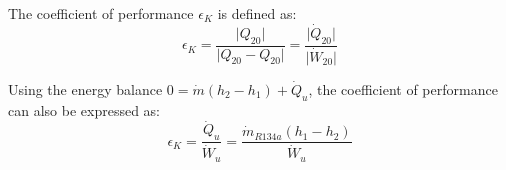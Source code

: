 The coefficient of performance \( \epsilon_K \) is defined as:  
\[
\epsilon_K = \frac{\lvert Q_{20} \rvert}{\lvert Q_{20} - Q_{20} \rvert} = \frac{\lvert \dot{Q}_{20} \rvert}{\lvert \dot{W}_{20} \rvert}
\]  

Using the energy balance \( 0 = \dot{m}(h_2 - h_1) + \dot{Q}_u \), the coefficient of performance can also be expressed as:  
\[
\epsilon_K = \frac{\dot{Q}_u}{\dot{W}_u} = \frac{\dot{m}_{R134a}(h_1 - h_2)}{\dot{W}_u}
\]